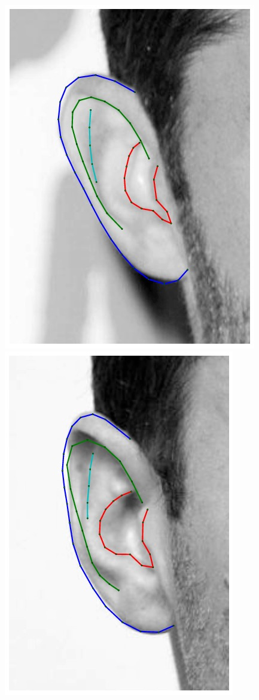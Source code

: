 \begin{figure}[!t]
    \includegraphics[height=\flowhh]{resources/Ear_Deformable_Model/fittings/final_0024}
    \includegraphics[height=\flowhh]{resources/Ear_Deformable_Model/fittings/final_0025}

\end{figure}
